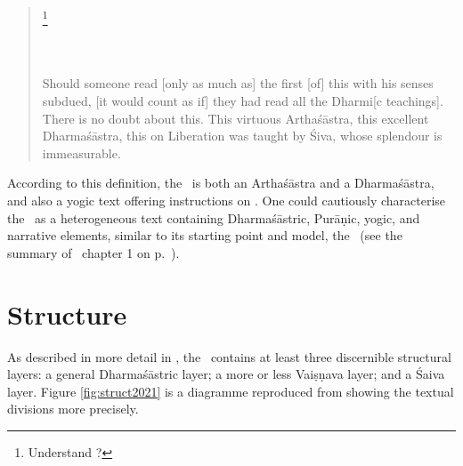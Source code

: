 \begin{quote}
% 
		\footnote{Understand ?}
							\\
\\
\\

Should someone read [only as much as] the first  [of]
this  with his senses subdued, [it would count as if]
they had read all the Dharmi[c teachings]. There is no doubt about this.
This virtuous Arthaśāstra, this excellent Dharmaśāstra, 
this  on Liberation was taught by Śiva, whose splendour is
immeasurable.
\end{quote}

\noindent
According to this definition, the \VSS\ is both an Arthaśāstra and a
Dharmaśāstra, and also a yogic text offering instructions on .
One could cautiously characterise the \VSS\ as a heterogeneous
text containing Dharmaśāstric, Purāṇic, yogic, and narrative elements,
similar to its starting point and model, the \MBh\
(see the summary of \VSS\ chapter 1 on p.~\pageref{contents_of_ch01}).




\section{Structure}\label{structure}

As described in more detail in ,
the \VSS\ contains at least three discernible structural layers:
a general Dharmaśāstric layer; a more or less Vaiṣṇa\-va layer;
and a Śaiva layer. Figure \ref{fig:struct2021} is
a diagramme reproduced from 
showing the textual divisions more precisely.

